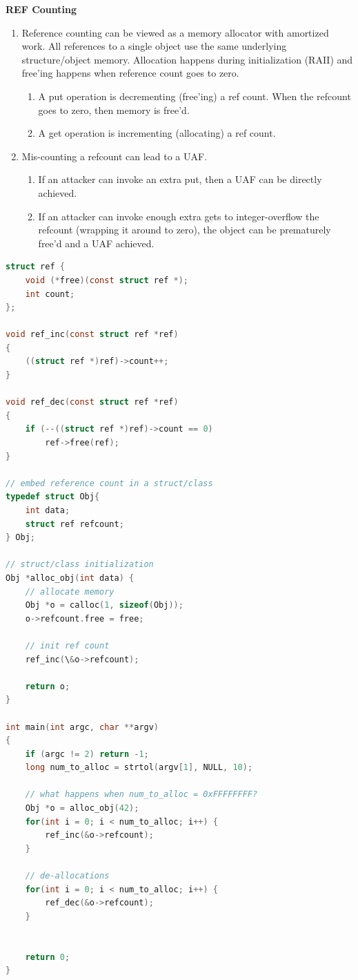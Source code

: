 \documentclass[12pt]{Training}
\begin{document}
\textbf{REF Counting}
\begin{enumerate}
    \item Reference counting can be viewed as a memory allocator with amortized work. All references to a single object use the same underlying structure/object memory. Allocation happens during initialization (RAII) and free'ing happens when reference count goes to zero.
    \begin{enumerate}
        \item A put operation is decrementing (free'ing) a ref count. When the refcount goes to zero, then memory is free'd.
        \item A get operation is incrementing (allocating) a ref count.
    \end{enumerate}
    \item Mis-counting a refcount can lead to a UAF.
    \begin{enumerate}
        \item If an attacker can invoke an extra put, then a UAF can be directly achieved.
        \item If an attacker can invoke enough extra gets to integer-overflow the refcount (wrapping it around to zero), the object can be prematurely free'd and a UAF achieved.
    \end{enumerate}
\end{enumerate}
\begin{sectionbox}
\begin{lstlisting}[language=C, caption={Incorrect Reference Counting}]
struct ref {
    void (*free)(const struct ref *);
    int count;
};

void ref_inc(const struct ref *ref)
{
    ((struct ref *)ref)->count++;
}

void ref_dec(const struct ref *ref)
{
    if (--((struct ref *)ref)->count == 0)
        ref->free(ref);
}

// embed reference count in a struct/class
typedef struct Obj{
    int data;
    struct ref refcount;
} Obj;

// struct/class initialization
Obj *alloc_obj(int data) {
    // allocate memory
    Obj *o = calloc(1, sizeof(Obj));
    o->refcount.free = free;

    // init ref count
    ref_inc(\&o->refcount);

    return o;
}

int main(int argc, char **argv)
{
    if (argc != 2) return -1;
    long num_to_alloc = strtol(argv[1], NULL, 10);

    // what happens when num_to_alloc = 0xFFFFFFFF?
    Obj *o = alloc_obj(42);
    for(int i = 0; i < num_to_alloc; i++) {
        ref_inc(&o->refcount);
    }

    // de-allocations
    for(int i = 0; i < num_to_alloc; i++) {
        ref_dec(&o->refcount);
    }
    

    return 0;
}
\end{lstlisting}
\end{sectionbox}
\end{document}

